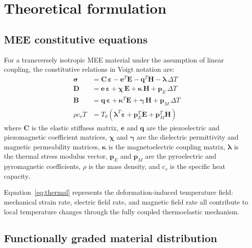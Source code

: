 \documentclass[11pt,a4paper]{article}
\newcommand{\bsig}{\bm{\sigma}}
\newcommand{\beps}{\bm{\varepsilon}}
\newcommand{\bD}{\bm{D}}
\newcommand{\bB}{\bm{B}}
\newcommand{\bE}{\bm{E}}
\newcommand{\bH}{\bm{H}}
\begin{document}
\section{Theoretical formulation}

\subsection{MEE constitutive equations}

For a transversely isotropic MEE material under the assumption of linear coupling, the constitutive relations in Voigt notation are:
\begin{align}
\bsig &= \bm{C}\,\beps - \bm{e}^T\bE - \bm{q}^T\bH - \bm{\lambda}\,\Delta T \label{eq:stress}\\
\bD &= \bm{e}\,\beps + \bm{\chi}\,\bE + \bm{\kappa}\,\bH + \bm{p}_E\,\Delta T \label{eq:D}\\
\bB &= \bm{q}\,\beps + \bm{\kappa}^T\bE + \bm{\gamma}\,\bH + \bm{p}_M\,\Delta T \label{eq:B}\\
\rho c_v \dot{T} &= T_0\left(\bm{\lambda}^T\dot{\beps} + \bm{p}_E^T\dot{\bE} + \bm{p}_M^T\dot{\bH}\right) \label{eq:thermal}
\end{align}
where $\bm{C}$ is the elastic stiffness matrix, $\bm{e}$ and $\bm{q}$ are the piezoelectric and piezomagnetic coefficient matrices, $\bm{\chi}$ and $\bm{\gamma}$ are the dielectric permittivity and magnetic permeability matrices, $\bm{\kappa}$ is the magnetoelectric coupling matrix, $\bm{\lambda}$ is the thermal stress modulus vector, $\bm{p}_E$ and $\bm{p}_M$ are the pyroelectric and pyromagnetic coefficients, $\rho$ is the mass density, and $c_v$ is the specific heat capacity.

Equation~\eqref{eq:thermal} represents the deformation-induced temperature field: mechanical strain rate, electric field rate, and magnetic field rate all contribute to local temperature changes through the fully coupled thermoelastic mechanism.

\subsection{Functionally graded material distribution}
\end{document}
